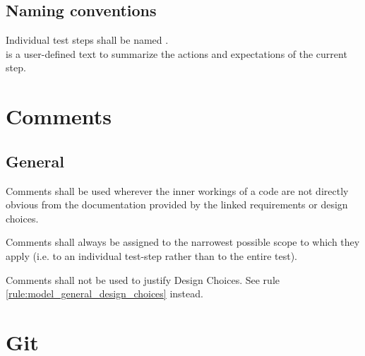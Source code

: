 \documentclass[draft]{efsguide}
\begin{document}
\section{Naming conventions}
\label{rules:tests_naming}
\begin{rules}
\item Individual test steps shall be named .\\  is a user-defined text to summarize the actions and expectations of the current step. 
\end{rules}


\chapter{Comments}
\section{General}
\begin{rules}
\item \label{rule:comments_inner_workings} Comments shall be used wherever the inner workings of a code are not directly obvious from the documentation provided by the linked requirements or design choices. 
\item Comments shall always be assigned to the narrowest possible scope to which they apply (i.e. to an individual test-step rather than to the entire test). 
\item Comments shall not be used to justify Design Choices. See rule \ref{rule:model_general_design_choices} instead. 
\item \deleted
\end{rules}


\chapter{Git}
\end{document}

